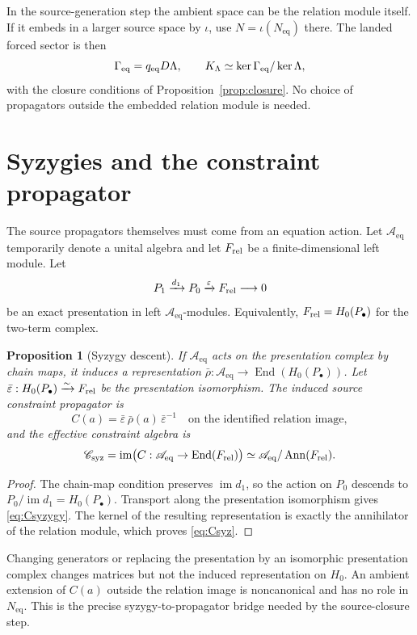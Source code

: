 \documentclass[11pt]{amsart}
\newtheorem{proposition}[theorem]{Proposition}
\theoremstyle{definition}
\newcommand{\im}{\operatorname{im}}
\newcommand{\End}{\operatorname{End}}
\newcommand{\Aeq}{\mathscr A_{\mathrm{eq}}}
\newcommand{\Neq}{N_{\mathrm{eq}}}
\newcommand{\Geq}{\Gamma_{\mathrm{eq}}}
\newcommand{\Csyz}{\mathscr C_{\mathrm{syz}}}
\begin{document}
In the source-generation step the ambient space can be the relation module itself.
If it embeds in a larger source space by \(\iota\), use \(N=\iota(\Neq)\) there.
The landed forced sector is then
\[
\Geq=q_{\rm eq}D\Lambda,\qquad
K_\Lambda\simeq\ker\Geq/\ker\Lambda,
\]
with the closure conditions of Proposition~\ref{prop:closure}. No choice of
propagators outside the embedded relation module is needed.

\section{Syzygies and the constraint propagator}\label{sec:syzygy}

The source propagators themselves must come from an equation action. Let \(\Aeq\) temporarily denote
a unital algebra and let \(F_{\rm rel}\) be a finite-dimensional left module. Let
\[
P_1\xrightarrow{d_1}P_0\xrightarrow{\varepsilon}F_{\rm rel}\longrightarrow 0
\]
be an exact presentation in left \(\Aeq\)-modules. Equivalently,
\(F_{\rm rel}=H_0(P_\bullet)\) for the two-term complex.

\begin{proposition}[Syzygy descent]
If \(\Aeq\) acts on the presentation complex by chain maps, it induces a representation
\(\bar\rho:\Aeq\to\End(H_0(P_\bullet))\). Let
\(\bar\varepsilon:H_0(P_\bullet)\xrightarrow{\sim}F_{\rm rel}\)
be the presentation isomorphism. The induced source constraint
propagator is
\begin{equation}
C(a)=\bar\varepsilon\,\bar\rho(a)\,\bar\varepsilon^{-1}
\quad\text{on the identified relation image},
\label{eq:Csyzygy}
\end{equation}
and the effective constraint algebra is
\begin{equation}
\Csyz=\im\bigl(C:\Aeq\to\End(F_{\rm rel})\bigr)
\simeq\Aeq/\operatorname{Ann}(F_{\rm rel}).
\label{eq:Csyz}
\end{equation}
\end{proposition}

\begin{proof}
The chain-map condition preserves \(\im d_1\), so the action on \(P_0\) descends to
\(P_0/\im d_1=H_0(P_\bullet)\). Transport along the presentation isomorphism gives
\eqref{eq:Csyzygy}. The kernel of the resulting representation is exactly the annihilator of the
relation module, which proves \eqref{eq:Csyz}.
\end{proof}

Changing generators or replacing the presentation by an isomorphic presentation complex changes matrices but
not the induced representation on \(H_0\). An ambient extension of \(C(a)\) outside the relation
image is noncanonical and has no role in \(\Neq\). This is the precise syzygy-to-propagator bridge
needed by the source-closure step.
\end{document}

